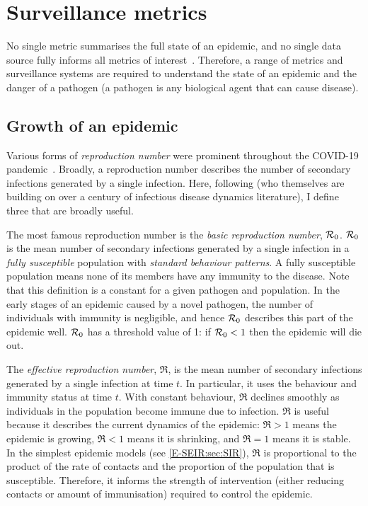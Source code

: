 \documentclass[thesis.tex]{subfiles}
\begin{document}
\section{Surveillance metrics}

No single metric summarises the full state of an epidemic, and no single data source fully informs all metrics of interest~\autocite{royalSocietyRnumber,pellisEstimation,paragGrowthRates}.
Therefore, a range of metrics and surveillance systems are required to understand the state of an epidemic and the danger of a pathogen (a pathogen is any biological agent that can cause disease).

\subsection{Growth of an epidemic}

Various forms of \emph{reproduction number} were prominent throughout the COVID-19 pandemic~\autocite{pellisEstimation}.
Broadly, a reproduction number describes the number of secondary infections generated by a single infection.
Here, following \textcite{pellisEstimation} (who themselves are building on over a century of infectious disease dynamics literature), I define three that are broadly useful.

The most famous reproduction number is the \emph{basic reproduction number}, $\mathcal{R}_{0}$.
$\mathcal{R}_{0}$ is the mean number of secondary infections generated by a single infection in a \emph{fully susceptible} population with \emph{standard behaviour patterns}.
A fully susceptible population means none of its members have any immunity to the disease.
Note that this definition is a constant for a given pathogen and population.
In the early stages of an epidemic caused by a novel pathogen, the number of individuals with immunity is negligible, and hence $\mathcal{R}_{0}$ describes this part of the epidemic well.
$\mathcal{R}_{0}$ has a threshold value of 1: if $\mathcal{R}_{0} < 1$ then the epidemic will die out.

The \emph{effective reproduction number}, $\Re$, is the mean number of secondary infections generated by a single infection at time $t$.
In particular, it uses the behaviour and immunity status at time $t$.
With constant behaviour, $\Re$ declines smoothly as individuals in the population become immune due to infection.
$\Re$ is useful because it describes the current dynamics of the epidemic: $\Re > 1$ means the epidemic is growing, $\Re < 1$ means it is shrinking, and $\Re = 1$ means it is stable.
In the simplest epidemic models (see \cref{E-SEIR:sec:SIR}), $\Re$ is proportional to the product of the rate of contacts and the proportion of the population that is susceptible.
Therefore, it informs the strength of intervention (either reducing contacts or amount of immunisation) required to control the epidemic.
\end{document}

